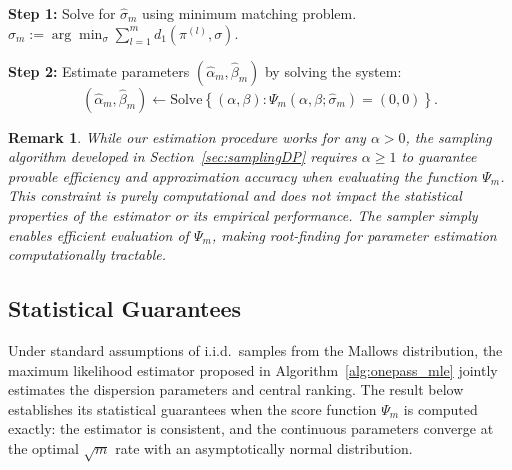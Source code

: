 \documentclass{article}
\newtheorem{remark}[theorem]{Remark} %
\begin{document}
\begin{algorithm}[ht]
\caption{MLE for \(\{\alpha,\beta,\sigma\}\) in the Mallows Model}
\label{alg:onepass_mle}
\DontPrintSemicolon
{}


  {\textbf{Step 1:} Solve for \(\hat\sigma_m\) using minimum matching problem.}
  \(\displaystyle 
     \hat\sigma_m 
       := \arg\min_{\sigma}
         \sum_{l=1}^m d_1(\pi^{(l)},\sigma).
   \)
   
\textbf{Step 2:} Estimate parameters \((\hat\alpha_m, \hat\beta_m)\) by solving the system:
\[
(\hat\alpha_m, \hat\beta_m) \leftarrow \text{Solve}\left\{(\alpha,\beta): \Psi_m(\alpha,\beta;\hat\sigma_m)=(0,0)\right\}.
\]
\end{algorithm}


\begin{remark} While our estimation procedure works for any $\alpha > 0$, the sampling algorithm developed in Section~\ref{sec:samplingDP} requires $\alpha \geq 1$ to guarantee provable efficiency and approximation accuracy when evaluating the function $\Psi_m$. This constraint is purely computational and does not impact the statistical properties of the estimator or its empirical performance. The sampler simply enables efficient evaluation of  $\Psi_m$, making root-finding for parameter estimation computationally tractable.
\end{remark}

\subsection{Statistical Guarantees}


Under standard assumptions of i.i.d.\ samples from the Mallows distribution, the maximum likelihood estimator proposed in Algorithm~\ref{alg:onepass_mle} jointly estimates the dispersion parameters and central ranking. The result below establishes its statistical guarantees when the score function \(\Psi_m\) is computed exactly: the estimator is consistent, and the continuous parameters converge at the optimal \(\sqrt{m}\) rate with an asymptotically normal distribution.
\end{document}
